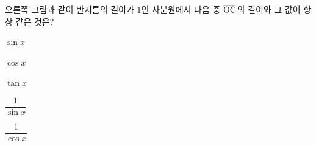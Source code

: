 \noindent\begin{minipage}[t]{0.58\linewidth}\vspace{0pt}\raggedright 오른쪽 그림과 같이 반지름의 길이가 $1$인 사분원에서 다음 중 $\overline{\mathrm{OC}}$의 길이와 그 값이 항상 같은 것은?\end{minipage}\hfill\begin{minipage}[t]{0.4\linewidth}\vspace{0pt}\centering \resizebox{\ifdim\width>\linewidth\linewidth\else\width\fi}{!}{}\end{minipage}\par
\begin{choicesii}{\rule[-3ex]{0pt}{8ex}$\sin x$}{\rule[-3ex]{0pt}{8ex}$\cos x$}{\rule[-3ex]{0pt}{8ex}$\tan x$}{\rule[-3ex]{0pt}{8ex}$\dfrac{1}{\sin x}$}{\rule[-3ex]{0pt}{8ex}$\dfrac{1}{\cos x}$}\end{choicesii}
